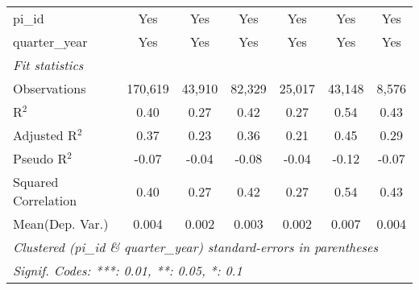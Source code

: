 \begin{tabular}{lcccccc}
   pi\_id                                                     & Yes            & Yes            & Yes            & Yes          & Yes            & Yes\\  
   quarter\_year                                              & Yes            & Yes            & Yes            & Yes          & Yes            & Yes\\  
   \midrule
   \emph{Fit statistics}\\
   Observations                                               & 170,619        & 43,910         & 82,329         & 25,017       & 43,148         & 8,576\\  
   R$^2$                                                      & 0.40           & 0.27           & 0.42           & 0.27         & 0.54           & 0.43\\  
   Adjusted R$^2$                                             & 0.37           & 0.23           & 0.36           & 0.21         & 0.45           & 0.29\\  
   Pseudo R$^2$                                               & -0.07          & -0.04          & -0.08          & -0.04        & -0.12          & -0.07\\  
   Squared Correlation                                        & 0.40           & 0.27           & 0.42           & 0.27         & 0.54           & 0.43\\  
Mean(Dep. Var.) & 0.004 & 0.002 & 0.003 & 0.002 & 0.007 & 0.004 \\
   \midrule \midrule
   \multicolumn{7}{l}{\emph{Clustered (pi\_id \& quarter\_year) standard-errors in parentheses}}\\
   \multicolumn{7}{l}{\emph{Signif. Codes: ***: 0.01, **: 0.05, *: 0.1}}\\
\end{tabular}
\par\endgroup
